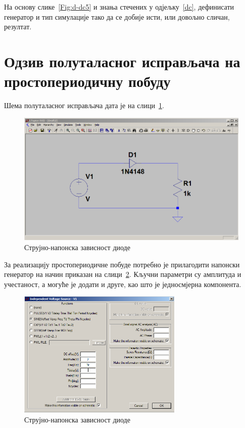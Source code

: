 На основу слике~\ref{Fig:d-dc5} и знања стечених у одјељку~\ref{dc}, дефинисати генератор и тип симулације тако да се добије исти, или довољно сличан, резултат.

\section{Одзив полуталасног исправљача на простопериодичну побуду}
\label{hwr}

Шема полуталасног исправљача дата је на слици~\ref{Fig:hwr-tran0}.

\begin{figure}[h]
\centering
\includegraphics[width=\figwidth\textwidth]{figs/hwr-tran0.PNG}
\caption{Струјно-напонска зависност диоде}
\label{Fig:hwr-tran0}
\end{figure}

За реализацију простопериодичне побуде потребно је прилагодити напонски генератор на начин приказан на слици~\ref{Fig:hwr-tran1}. Кључни параметри су амплитуда и учестаност, а могуће је додати и друге, као што је једносмјерна компонента.

\begin{figure}[h]
\centering
\includegraphics[width=0.7\textwidth]{figs/hwr-tran1.PNG}
\caption{Струјно-напонска зависност диоде}
\label{Fig:hwr-tran1}
\end{figure}

